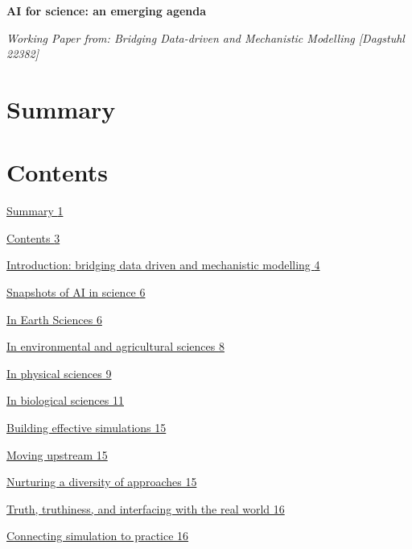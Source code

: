 \textbf{AI for science: an emerging agenda}

\emph{Working Paper from: Bridging Data-driven and Mechanistic Modelling
{[}Dagstuhl 22382{]}}

\hypertarget{summary}{%
\section{Summary}\label{summary}}


\hypertarget{contents}{%
\section{Contents}\label{contents}}

\protect\hyperlink{summary}{Summary \protect\hyperlink{summary}{1}}

\protect\hyperlink{_Toc121762019}{Contents
\protect\hyperlink{_Toc121762019}{3}}

\protect\hyperlink{introduction-bridging-data-driven-and-mechanistic-modelling}{Introduction:
bridging data driven and mechanistic modelling
\protect\hyperlink{introduction-bridging-data-driven-and-mechanistic-modelling}{4}}

\protect\hyperlink{snapshots-of-ai-in-science}{Snapshots of AI in
science \protect\hyperlink{snapshots-of-ai-in-science}{6}}

\protect\hyperlink{in-earth-sciences}{In Earth Sciences
\protect\hyperlink{in-earth-sciences}{6}}

\protect\hyperlink{in-environmental-and-agricultural-sciences}{In
environmental and agricultural sciences
\protect\hyperlink{in-environmental-and-agricultural-sciences}{8}}

\protect\hyperlink{in-physical-sciences}{In physical sciences 9}

\protect\hyperlink{section}{In biological sciences 11}

\protect\hyperlink{building-effective-simulations}{Building effective
simulations 15}

\protect\hyperlink{moving-upstream}{Moving upstream 15}

\protect\hyperlink{nurturing-a-diversity-of-approaches}{Nurturing a
diversity of approaches 15}

\protect\hyperlink{truth-truthiness-and-interfacing-with-the-real-world}{Truth,
truthiness, and interfacing with the real world 16}

\protect\hyperlink{connecting-simulation-to-practice}{Connecting
simulation to practice 16}

